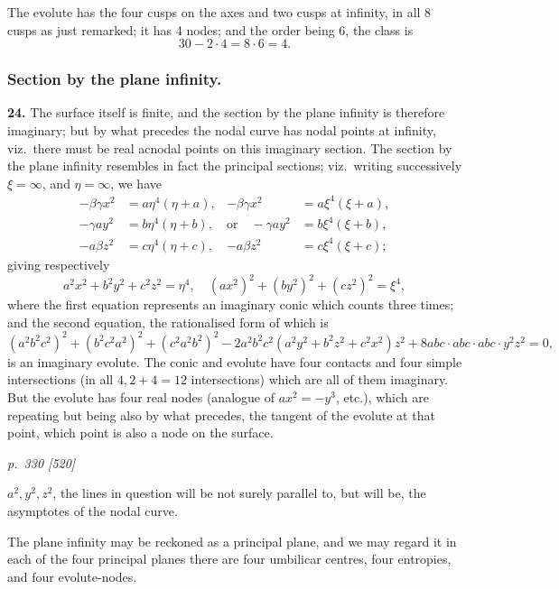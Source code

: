 \documentclass[11pt,a4paper]{book}
\begin{document}
The evolute has the four cusps on the axes and two cusps at infinity, in all 8 cusps as just remarked; it has 4 nodes; and the order being 6, the class is
\[
30 - 2 \cdot 4 = 8 \cdot 6 = 4.
\]

\subsubsection*{Section by the plane infinity.}

\textbf{24.} The surface itself is finite, and the section by the plane infinity is therefore imaginary; but by what precedes the nodal curve has nodal points at infinity, viz.\ there must be real acnodal points on this imaginary section. The section by the plane infinity resembles in fact the principal sections; viz.\ writing successively $\xi = \infty$, and $\eta = \infty$, we have
\begin{align*}
-\beta\gamma x^2 &= a\eta^4(\eta + a), & -\beta\gamma x^2 &= a\xi^4(\xi + a),\\
-\gamma a y^2 &= b\eta^4(\eta + b), & \text{or}\quad -\gamma a y^2 &= b\xi^4(\xi + b),\\
-a\beta z^2 &= c\eta^4(\eta + c), & -a\beta z^2 &= c\xi^4(\xi + c);
\end{align*}
giving respectively
\[
a^2 x^2 + b^2 y^2 + c^2 z^2 = \eta^4,\quad (a x^2)^2 + (b y^2)^2 + (c z^2)^2 = \xi^4,
\]
where the first equation represents an imaginary conic which counts three times; and the second equation, the rationalised form of which is
\[
(a^2 b^2 c^2)^2 + (b^2 c^2 a^2)^2 + (c^2 a^2 b^2)^2 - 2a^2 b^2 c^2 (a^2 y^2 + b^2 z^2 + c^2 x^2) z^2 + 8a b c \cdot a b c \cdot a b c \cdot y^2 z^2 = 0,
\]
is an imaginary evolute. The conic and evolute have four contacts and four simple intersections (in all $4, 2 + 4 = 12$ intersections) which are all of them imaginary. But the evolute has four real nodes (analogue of $a x^2 = -y^3$, etc.), which are repeating but being also by what precedes, the tangent of the evolute at that point, which point is also a node on the surface.

\clearpage

\bigskip
\textit{p.~330 [520]}
\smallskip

$a^2, y^2, z^2$, the lines in question will be not surely parallel to, but will be, the asymptotes of the nodal curve.

The plane infinity may be reckoned as a principal plane, and we may regard it in each of the four principal planes there are four umbilicar centres, four entropies, and four evolute-nodes.
\end{document}
